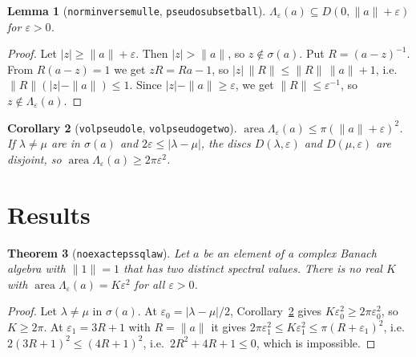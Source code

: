 \documentclass[11pt]{article}
\newtheorem{theorem}{Theorem}
\newtheorem{lemma}[theorem]{Lemma}
\newtheorem{corollary}[theorem]{Corollary}
\theoremstyle{definition}
\theoremstyle{remark}
\renewcommand{\_}{\oldus\allowbreak}
\newcommand{\area}{\operatorname{area}}
\begin{document}
\begin{lemma}[\texttt{norm\_inverse\_mul\_le}, \texttt{pseudo\_subset\_ball}]\label{lem:out}
$\Lambda_\varepsilon(a) \subseteq D(0,\|a\|+\varepsilon)$ for $\varepsilon>0$.
\end{lemma}
\begin{proof}
Let $|z|\ge\|a\|+\varepsilon$. Then $|z|>\|a\|$, so $z\notin\sigma(a)$. Put $R=(a-z)^{-1}$. From
$R(a-z)=1$ we get $zR = Ra-1$, so $|z|\,\|R\| \le \|R\|\,\|a\|+1$, i.e.\ $\|R\|(|z|-\|a\|)\le 1$. Since
$|z|-\|a\|\ge\varepsilon$, we get $\|R\|\le\varepsilon^{-1}$, so $z\notin\Lambda_\varepsilon(a)$.
\end{proof}

\begin{corollary}[\texttt{vol\_pseudo\_le}, \texttt{vol\_pseudo\_ge\_two}]\label{cor:area}
$\area\Lambda_\varepsilon(a)\le\pi(\|a\|+\varepsilon)^2$. If $\lambda\ne\mu$ are in $\sigma(a)$ and
$2\varepsilon\le|\lambda-\mu|$, the discs $D(\lambda,\varepsilon)$ and $D(\mu,\varepsilon)$ are disjoint, so
$\area\Lambda_\varepsilon(a)\ge 2\pi\varepsilon^2$.
\end{corollary}

\section{Results}

\begin{theorem}[\texttt{no\_exact\_eps\_sq\_law}]\label{thm:growth}
Let $a$ be an element of a complex Banach algebra with $\|1\|=1$ that has two distinct spectral values. There is
no real $K$ with $\area\Lambda_\varepsilon(a) = K\varepsilon^2$ for all $\varepsilon>0$.
\end{theorem}
\begin{proof}
Let $\lambda\ne\mu$ in $\sigma(a)$. At $\varepsilon_0=|\lambda-\mu|/2$, Corollary~\ref{cor:area} gives
$K\varepsilon_0^2 \ge 2\pi\varepsilon_0^2$, so $K\ge 2\pi$. At $\varepsilon_1=3R+1$ with $R=\|a\|$ it gives
$2\pi\varepsilon_1^2\le K\varepsilon_1^2\le\pi(R+\varepsilon_1)^2$, i.e.\ $2(3R+1)^2\le(4R+1)^2$, i.e.\
$2R^2+4R+1\le 0$, which is impossible.
\end{proof}
\end{document}
